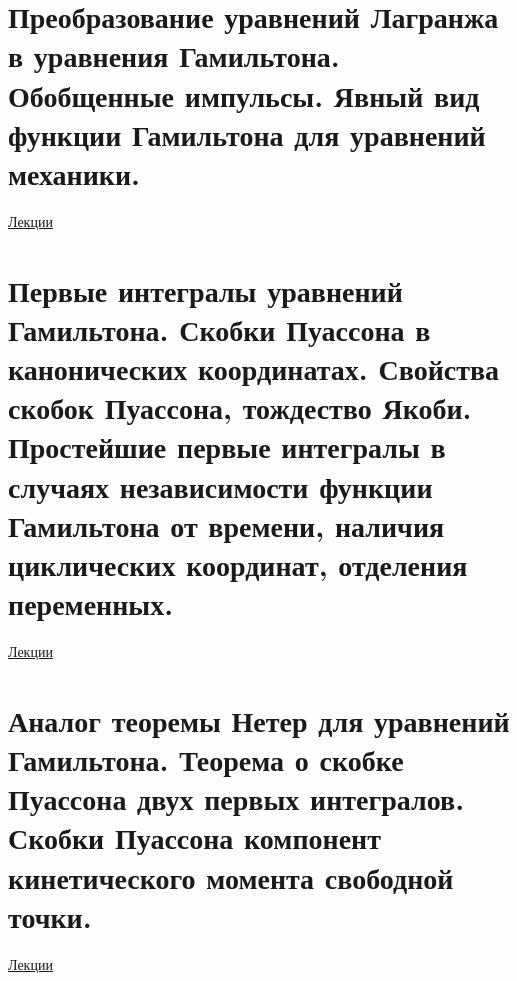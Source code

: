 \documentclass[specialist, subf, href, colorlinks=true, 12pt, times, mtpro, final]{disser}
\theoremstyle{definition}
\begin{document}
    \section{Преобразование уравнений Лагранжа в уравнения Гамильтона. Обобщенные импульсы. Явный вид функции Гамильтона для уравнений механики.}
     \label{13}
     \hyperlink {lects.16}{Лекции} \\
    
        
    \section{Первые интегралы уравнений Гамильтона. Скобки Пуассона в канонических координатах. Свойства скобок Пуассона, тождество Якоби. Простейшие первые интегралы в случаях независимости функции Гамильтона от времени, наличия циклических координат, отделения переменных.}
     \label{14}
    \hyperlink {lects.18}{Лекции} \\
    
    \section{Аналог теоремы Нетер для уравнений Гамильтона. Теорема о скобке Пуассона двух первых интегралов. Скобки Пуассона компонент кинетического момента свободной точки.}
     \label{15}
    \hyperlink {lects.18}{Лекции} \\
    
\end{document}
